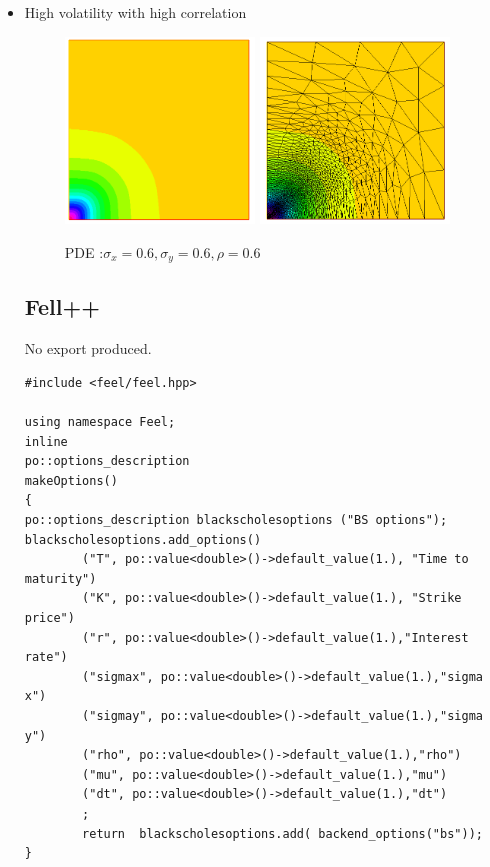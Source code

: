 \documentclass[a4paper]{report}
\begin{document}
\begin{itemize}
\begin{itemize}
\item {High volatility with high correlation}
\begin{figure}[H]
   \includegraphics[width=0.475\textwidth]{bs4a.png}
   \hfill
   \includegraphics[width=0.475\textwidth]{bs4b.png}
    \caption{ PDE :$\sigma_x=0.6, \sigma_y=0.6, \rho=0.6$}
\end{figure}




\subsection{Fell++}
No export produced.
\begin{lstlisting}[backgroundcolor = \color{light-gray}]
 #include <feel/feel.hpp>

using namespace Feel;
inline
po::options_description
makeOptions()
{
po::options_description blackscholesoptions ("BS options");
blackscholesoptions.add_options()
        ("T", po::value<double>()->default_value(1.), "Time to maturity")
        ("K", po::value<double>()->default_value(1.), "Strike price")
        ("r", po::value<double>()->default_value(1.),"Interest rate")
        ("sigmax", po::value<double>()->default_value(1.),"sigma x")
        ("sigmay", po::value<double>()->default_value(1.),"sigma y")
        ("rho", po::value<double>()->default_value(1.),"rho")
        ("mu", po::value<double>()->default_value(1.),"mu")
        ("dt", po::value<double>()->default_value(1.),"dt")
        ;
        return  blackscholesoptions.add( backend_options("bs"));
}


\end{lstlisting}
\end{itemize}
\end{itemize}
\end{document}
